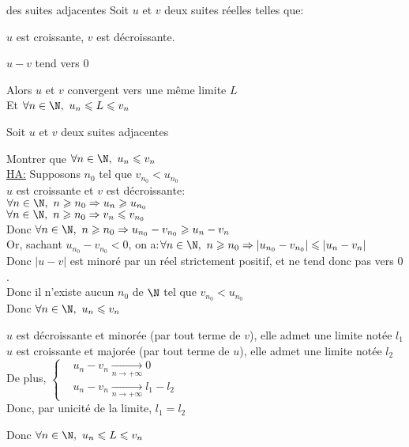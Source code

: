 \documentclass[12pt,twoside,a4paper]{article}
\begin{document}
	\begin{theo}{des suites adjacentes}
		Soit $u$ et $v$ deux suites r\'eelles telles que:
		\begin{liste}
			\item $u$ est croissante, $v$ est d\'ecroissante.
			\item $u-v$ tend vers $0$
		\end{liste}
		Alors $u$ et $v$ convergent vers une m\^eme limite $L$\\Et $\forall n\in\N,\ u_n\leqslant L\leqslant v_n$
	\end{theo}
	\newpage
	\begin{preuve}
		Soit $u$ et $v$ deux suites adjacentes
		\begin{liste}
			\item[\cercle1] Montrer que $\forall n\in\N,\ u_n\leqslant v_n$\\
				\underline{HA:} Supposons $n_0$ tel que $v_{n_0}<u_{n_0}$\\
				$u$ est croissante et $v$ est d\'ecroissante:\\
				$\forall n\in\N,\ n\geqslant n_0\Rightarrow u_n\geqslant u_{n_0}$\\
				$\forall n\in\N,\ n\geqslant n_0\Rightarrow v_n\leqslant v_{n_0}$\\
				Donc $\forall n\in\N,\ n\geqslant n_0\Rightarrow u_{n_0}-v_{n_0}\geqslant u_n-v_n$\\
				Or, sachant $u_{n_0}-v_{n_0}<0$, on a:$\forall n\in\N,\ n\geqslant n_0\Rightarrow |u_{n_0}-v_{n_0}|\leqslant |u_n-v_n|$\\
				Donc $|u-v|$ est minor\'e par un r\'eel strictement positif, et ne tend donc pas vers $0$.\\
				Donc il n'existe aucun $n_0$ de $\N$ tel que $v_{n_0}<u_{n_0}$\\
				Donc $\forall n\in\N,\ u_n\leqslant v_n$
			\item[\cercle2] $u$ est d\'ecroissante et minor\'ee (par tout terme de $v$), elle admet une limite not\'ee $l_1$\\
				$u$ est croissante et major\'ee (par tout terme de $u$), elle admet une limite not\'ee $l_2$\\
				De plus,
				$\left\{\begin{aligned}
					& u_n-v_n\mathop{\longrightarrow}\limits_{n\rightarrow+\infty}0\\
					& u_n-v_n\mathop{\longrightarrow}\limits_{n\rightarrow+\infty}l_1-l_2
				\end{aligned}\right.$\\
				Donc, par unicit\'e de la limite, $l_1=l_2$
		\end{liste}
		Donc $\forall n\in\N,\ u_n\leqslant L\leqslant v_n$
	\end{preuve}
\end{document}
